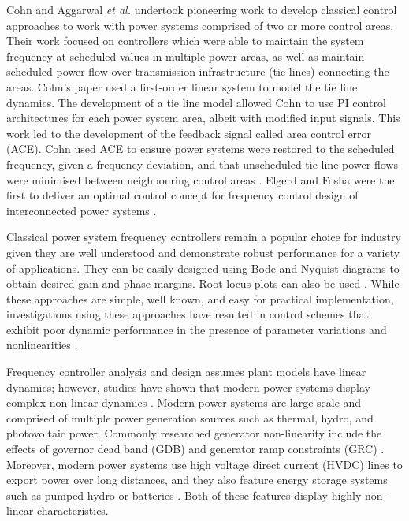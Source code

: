 Cohn \cite{Cohn1971} and Aggarwal \textit{et al.} \cite{Aggarwal1968, Aggarwal1968a} undertook pioneering work to develop classical control approaches to work with power systems comprised of two or more control areas. Their work focused on controllers which were able to maintain the system frequency at scheduled values in multiple power areas, as well as maintain scheduled power flow over transmission infrastructure (tie lines) connecting the areas. Cohn's paper used a first-order linear system to model the tie line dynamics. The development of a tie line model allowed Cohn to use PI control architectures for each power system area, albeit with modified input signals. This work led to the development of the feedback signal called area control error (ACE). Cohn used ACE to ensure power systems were restored to the scheduled frequency, given a frequency deviation, and that unscheduled tie line power flows were minimised between neighbouring control areas \cite{Cohn1956}. Elgerd and Fosha were the first to deliver an optimal control concept for frequency control design of interconnected power systems \cite{Elgerd1970}. 

Classical power system frequency controllers remain a popular choice for industry given they are well understood and demonstrate robust performance for a variety of applications. They can be easily designed using Bode and Nyquist diagrams to obtain desired gain and phase margins. Root locus plots can also be used \cite{Ogat2010}. While these approaches are simple, well known, and easy for practical implementation, investigations using these approaches have resulted in control schemes that exhibit poor dynamic performance in the presence of parameter variations and nonlinearities \cite{Kundur1994, Elgerd1970, Bechert1977}.

Frequency controller analysis and design assumes plant models have linear dynamics; however, studies have shown that modern power systems display complex non-linear dynamics \cite{Concordia1957, Kwatny1975, Elgerd1994, Morsali2014}. Modern power systems are large-scale and comprised of multiple power generation sources such as thermal, hydro, and photovoltaic power. Commonly researched generator non-linearity include the effects of governor dead band (GDB) \cite{Concordia1957} and generator ramp constraints (GRC) \cite{Kwatny1975, Elgerd1994}. Moreover, modern power systems use high voltage direct current (HVDC) lines to export power over long distances, and they also feature energy storage systems such as pumped hydro or batteries \cite{Bevrani2011, Glover2012, Kothari2011, Kundur1994}. Both of these features display highly non-linear characteristics.

